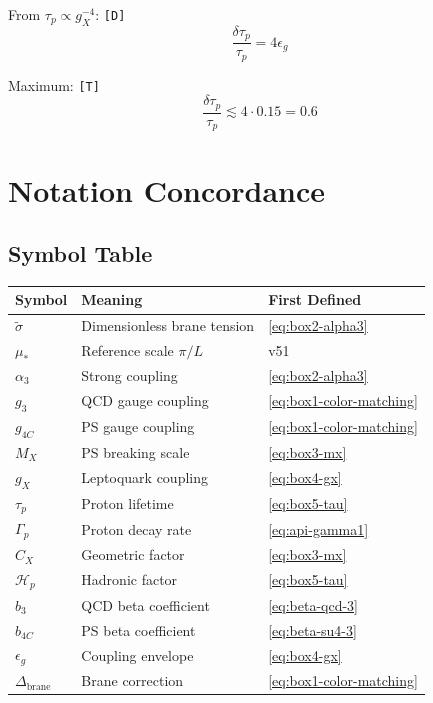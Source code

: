 \documentclass[11pt,a4paper]{article}
\newcommand{\tagD}{\textcolor{green!50!black}{\texttt{[D]}}}
\newcommand{\tagT}{\textcolor{cyan!70!black}{\texttt{[T]}}}
\theoremstyle{definition}
\begin{document}
From $\tau_p \propto g_X^{-4}$: \tagD{}
\begin{equation}
\label{eq:tau-err-1}
\frac{\delta\tau_p}{\tau_p} = 4\epsilon_g
\end{equation}

Maximum: \tagT{}
\begin{equation}
\label{eq:tau-err-2}
\frac{\delta\tau_p}{\tau_p} \lesssim 4 \cdot 0.15 = 0.6
\end{equation}

\section{Notation Concordance}
\label{app:notation}

\subsection{Symbol Table}
\label{app:symbols}

\begin{center}
\begin{longtable}{lll}
\toprule
Symbol & Meaning & First Defined \\
\midrule
\endhead
$\tilde{\sigma}$ & Dimensionless brane tension & \cref{eq:box2-alpha3} \\
$\mu_*$ & Reference scale $\pi/L$ & v51 \\
$\alpha_3$ & Strong coupling & \cref{eq:box2-alpha3} \\
$g_3$ & QCD gauge coupling & \cref{eq:box1-color-matching} \\
$g_{4C}$ & PS gauge coupling & \cref{eq:box1-color-matching} \\
$M_X$ & PS breaking scale & \cref{eq:box3-mx} \\
$g_X$ & Leptoquark coupling & \cref{eq:box4-gx} \\
$\tau_p$ & Proton lifetime & \cref{eq:box5-tau} \\
$\Gamma_p$ & Proton decay rate & \cref{eq:api-gamma1} \\
$C_X$ & Geometric factor & \cref{eq:box3-mx} \\
$\mathcal{H}_p$ & Hadronic factor & \cref{eq:box5-tau} \\
$b_3$ & QCD beta coefficient & \cref{eq:beta-qcd-3} \\
$b_{4C}$ & PS beta coefficient & \cref{eq:beta-su4-3} \\
$\epsilon_g$ & Coupling envelope & \cref{eq:box4-gx} \\
$\Delta_{\text{brane}}$ & Brane correction & \cref{eq:box1-color-matching} \\
\bottomrule
\end{longtable}
\end{center}
\end{document}
